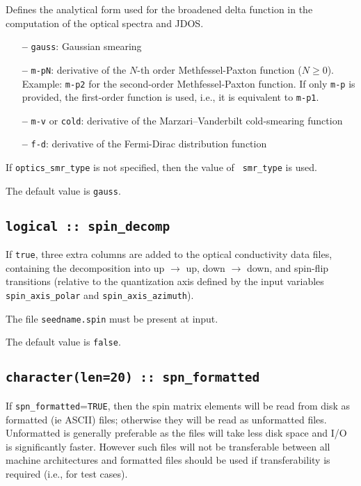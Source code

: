 Defines the analytical form used for the broadened delta function in
the computation of the optical spectra and JDOS.

\begin{itemize}
  
\item[{\bf --}]
  {\tt gauss}: Gaussian smearing

\item[{\bf --}]
  {\tt m-pN}: derivative of the $N$-th order
    Methfessel-Paxton function ($N\geq 0$). Example: {\tt m-p2} for the
  second-order Methfessel-Paxton function. If only {\tt m-p} is
  provided, the first-order function is used, i.e., it is equivalent to {\tt m-p1}.


\item[{\bf --}]
  {\tt m-v} or {\tt cold}: derivative of the Marzari--Vanderbilt cold-smearing function

\item[{\bf --}]
  {\tt f-d}: derivative of the Fermi-Dirac distribution function

\end{itemize}

If {\tt optics\_smr\_type} is not specified, then the value of {\tt
  smr\_type} is used.  

The default value is {\tt gauss}.

\subsection[spin\_decomp]{\tt logical :: spin\_decomp}
If {\tt true}, three extra columns are added to the optical
conductivity data files, containing the decomposition into up
$\rightarrow$ up, down $\rightarrow$ down, and spin-flip transitions
(relative to the quantization axis defined by the input variables {\tt
  spin\_axis\_polar} and {\tt spin\_axis\_azimuth}). 

The file {\tt seedname.spin} must be present at input.

The default value is \verb#false#.



\subsection[spn\_formatted]{\tt character(len=20) :: spn\_formatted}

If \verb#spn_formatted#=\verb#TRUE#, then the spin matrix elements will be
read from disk as formatted (ie ASCII) files; otherwise they will be
read as unformatted files. Unformatted is generally preferable as the
files will take less disk space and I/O is significantly
faster. However such files will not be transferable between all
machine architectures and formatted files should be used if
transferability is required (i.e., for test cases).

